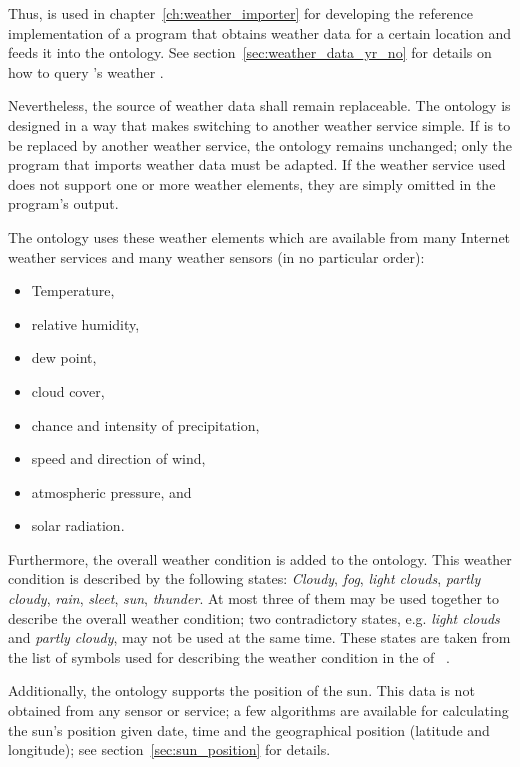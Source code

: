 Thus, \yrno is used in chapter~\ref{ch:weather_importer} for developing the reference implementation of a program that obtains weather data for a certain location and feeds it into the \smarthomeweather ontology. See section~\ref{sec:weather_data_yr_no} for details on how to query \yrno's weather .

Nevertheless, the source of weather data shall remain replaceable. The ontology is designed in a way that makes switching to another weather service simple. If \yrno is to be replaced by another weather service, the ontology remains unchanged; only the program that imports weather data must be adapted. If the weather service used does not support one or more weather elements, they are simply omitted in the program's output.

The ontology uses these weather elements which are available from many Internet weather services and many weather sensors (in no particular order):
\begin{itemize}
  \item Temperature,
  \item relative humidity,
  \item dew point,
  \item cloud cover,
  \item chance and intensity of precipitation,
  \item speed and direction of wind,
  \item atmospheric pressure, and
  \item solar radiation.
\end{itemize}

Furthermore, the overall weather condition is added to the ontology. This weather condition is described by the following states: \emph{Cloudy}, \emph{fog}, \emph{light clouds}, \emph{partly cloudy}, \emph{rain}, \emph{sleet}, \emph{sun}, \emph{thunder}. At most three of them may be used together to describe the overall weather condition; two contradictory states, e.g. \emph{light clouds} and \emph{partly cloudy}, may not be used at the same time. These states are taken from the list of symbols used for describing the weather condition in the  of \yrno~\cite{yrno_faq}.

Additionally, the ontology supports the position of the sun. This data is not obtained from any sensor or service; a few algorithms are available for calculating the sun's position given date, time and the geographical position (latitude and longitude); see section~\ref{sec:sun_position} for details.

